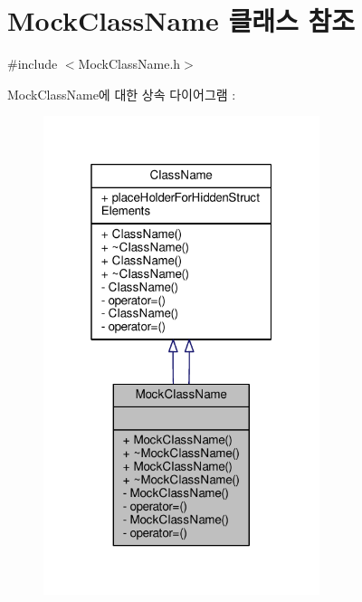 \hypertarget{class_mock_class_name}{}\section{Mock\+Class\+Name 클래스 참조}
\label{class_mock_class_name}


{\ttfamily \#include $<$Mock\+Class\+Name.\+h$>$}



Mock\+Class\+Name에 대한 상속 다이어그램 \+: 
\nopagebreak
\begin{figure}[H]
\begin{center}
\leavevmode
\includegraphics[width=229pt]{class_mock_class_name__inherit__graph}
\end{center}
\end{figure}


